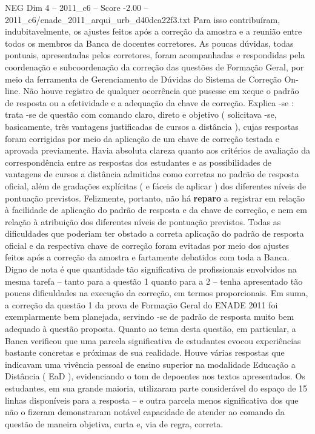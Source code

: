 \begin{textsample}{NEG Dim 4 – 2011\_c6 – Score -2.00 – 2011\_c6/enade\_2011\_arqui\_urb\_d40dca22f3.txt}
Para isso contribuíram, indubitavelmente, os ajustes feitos após a correção da amostra e a reunião entre todos os membros da Banca de docentes corretores.
As poucas dúvidas, todas pontuais, apresentadas pelos corretores, foram acompanhadas e respondidas pela coordenação e subcoordenação da correção das questões de Formação Geral, por meio da ferramenta de Gerenciamento de Dúvidas do Sistema de Correção On-line.
Não houve registro de qualquer ocorrência que pusesse em xeque o padrão de resposta ou a efetividade e a adequação da chave de correção.
Explica -se : trata -se de questão com comando claro, direto e objetivo ( solicitava -se, basicamente, três vantagens justificadas de cursos a distância ), cujas respostas foram corrigidas por meio da aplicação de um chave de correção testada e aprovada previamente.
Havia absoluta clareza quanto aos critérios de avaliação da correspondência entre as respostas dos estudantes e as possibilidades de vantagens de cursos a distância admitidas como corretas no padrão de resposta oficial, além de gradações explícitas ( e fáceis de aplicar ) dos diferentes níveis de pontuação previstos.
Felizmente, portanto, não há \textbf{reparo} a registrar em relação à facilidade de aplicação do padrão de resposta e da chave de correção, e nem em relação à atribuição dos diferentes níveis de pontuação previstos.
Todas as dificuldades que poderiam ter obstado a correta aplicação do padrão de resposta oficial e da respectiva chave de correção foram evitadas por meio dos ajustes feitos após a correção da amostra e fartamente debatidos com toda a Banca.
Digno de nota é que quantidade tão significativa de profissionais envolvidos na mesma tarefa – tanto para a questão 1 quanto para a 2 – tenha apresentado tão poucas dificuldades na execução da correção, em termos proporcionais.
Em suma, a correção da questão 1 da prova de Formação Geral do ENADE 2011 foi exemplarmente bem planejada, servindo -se de padrão de resposta muito bem adequado à questão proposta.
Quanto ao tema desta questão, em particular, a Banca verificou que uma parcela significativa de estudantes evocou experiências bastante concretas e próximas de sua realidade.
Houve várias respostas que indicavam uma vivência pessoal de ensino superior na modalidade Educação a Distância ( EaD ), evidenciando o tom de depoentes nos textos apresentados.
Os estudantes, em sua grande maioria, utilizaram parte considerável do espaço de 15 linhas disponíveis para a resposta – e outra parcela menos significativa dos que não o fizeram demonstraram notável capacidade de atender ao comando da questão de maneira objetiva, curta e, via de regra, correta.

\end{textsample}
